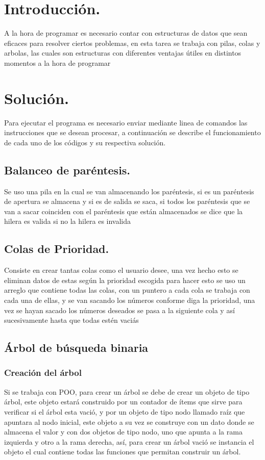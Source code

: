 \tableofcontents
\listoffigures
\newpage

\section{Introducción.}
A la hora de programar es necesario contar con estructuras de datos que sean eficaces para resolver ciertos problemas, en esta tarea se trabaja con pilas, colas 
y arbolas, las cuales son estructuras con diferentes ventajas útiles en distintos momentos a la hora de programar
\section{Solución.}
Para ejecutar el programa es necesario enviar mediante linea de comandos las instrucciones que se desean procesar, a continuación se describe el 
funcionamiento de cada uno de los códigos y su respectiva solución.

\subsection{Balanceo de paréntesis.}
Se uso una pila en la cual se van almacenando los paréntesis, si es un paréntesis de apertura se almacena y si es de salida se saca,
si todos los paréntesis que se van a sacar coinciden con el paréntesis que están almacenados se dice que la hilera es valida
si no la hilera es invalida

\subsection{Colas de Prioridad.}
Consiste en crear tantas colas como el usuario desee, una vez hecho esto se eliminan datos de estas según la prioridad escogida
para hacer esto se uso un arreglo que contiene todas las colas, con un puntero a cada cola se trabaja con cada una de ellas, 
y se van sacando los números conforme diga la prioridad,
una vez se hayan sacado los números deseados se pasa a la siguiente cola y así sucesivamente hasta que todas estén vaciás

\subsection{Árbol de búsqueda binaria}
\subsubsection{Creación del árbol}
Si se trabaja con POO, para crear un árbol se debe de crear un objeto de tipo árbol, este objeto estará construido por un contador de ítems
que sirve para verificar si el árbol esta vació, y por un objeto de tipo nodo llamado raíz que apuntara al nodo inicial, este objeto a su vez se construye con un dato donde se almacena el valor
y con dos objetos de tipo nodo, uno que apunta a la rama izquierda y otro a la rama derecha, así, para crear un árbol vació se instancia el objeto el cual
contiene todas las funciones que permitan construir un árbol.
